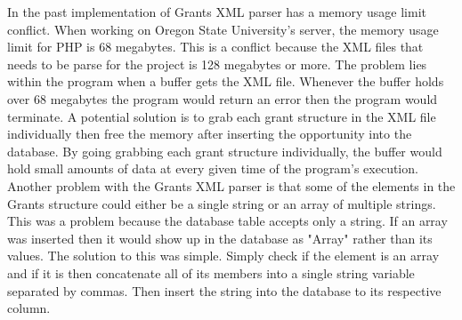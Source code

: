 \documentclass[onecolumn]{IEEEtran}
\begin{document}
In the past implementation of Grants XML parser has a memory usage limit conflict. When working on Oregon State University's server, the memory usage limit for PHP is 68 megabytes. This is a conflict because the XML files that needs to be parse for the project is 128 megabytes or more. The problem lies within the program when a buffer gets the XML file. Whenever the buffer holds over 68 megabytes the program would return an error then the program would terminate. A potential solution is to grab each grant structure in the XML file individually then free the memory after inserting the opportunity into the database. By going grabbing each grant structure individually, the buffer would hold small amounts of data at every given time of the program's execution. Another problem with the Grants XML parser is that some of the elements in the Grants structure could either be a single string or an array of multiple strings. This was a problem because the database table accepts only a string. If an array was inserted then it would show up in the database as "Array" rather than its values. The solution to this was simple. Simply check if the element is an array and if it is then concatenate all of its members into a single string variable separated by commas.  Then insert the string into the database to its respective column.  
\end{document}
